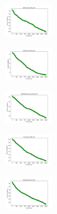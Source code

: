\begin{figure}[H]
\begin{subfigure}
    \end{subfigure}
    \hfill
    \begin{subfigure}
        \centering
        \includegraphics[width=0.234\textwidth]{img/ageun/ecoli_set_const_10_589741062_cost.png}
    \end{subfigure}
    \hfill
    \begin{subfigure}
        \centering
        \includegraphics[width=0.234\textwidth]{img/ageun/rand_set_const_10_589741062_cost.png}
    \end{subfigure}
    \hfill
    \begin{subfigure}
        \centering
        \includegraphics[width=0.234\textwidth]{img/ageun/newthyroid_set_const_10_589741062_cost.png}
    \end{subfigure}
    \hfill
    \begin{subfigure}
        \centering
        \includegraphics[width=0.234\textwidth]{img/ageun/iris_set_const_10_277451237_cost.png}
    \end{subfigure}
    \hfill
    \begin{subfigure}
        \centering
        \includegraphics[width=0.234\textwidth]{img/ageun/ecoli_set_const_10_277451237_cost.png}
    \end{subfigure}
    \hfill

\end{figure}
